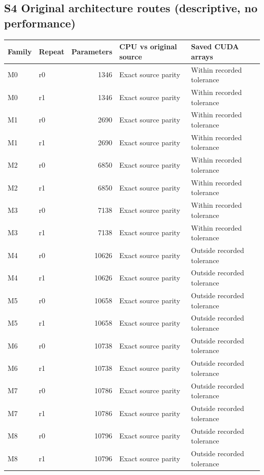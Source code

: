 \documentclass[9pt,a4paper]{extarticle}
\begin{document}
\subsection*{S4 Original architecture routes (descriptive, no performance)}\small
\begin{longtable}{llrll}
\toprule
Family & Repeat & Parameters & CPU vs original source & Saved CUDA arrays \\
\midrule
\endhead
M0 & r0 & 1346 & Exact source parity & Within recorded tolerance \\
M0 & r1 & 1346 & Exact source parity & Within recorded tolerance \\
M1 & r0 & 2690 & Exact source parity & Within recorded tolerance \\
M1 & r1 & 2690 & Exact source parity & Within recorded tolerance \\
M2 & r0 & 6850 & Exact source parity & Within recorded tolerance \\
M2 & r1 & 6850 & Exact source parity & Within recorded tolerance \\
M3 & r0 & 7138 & Exact source parity & Within recorded tolerance \\
M3 & r1 & 7138 & Exact source parity & Within recorded tolerance \\
M4 & r0 & 10626 & Exact source parity & Outside recorded tolerance \\
M4 & r1 & 10626 & Exact source parity & Outside recorded tolerance \\
M5 & r0 & 10658 & Exact source parity & Outside recorded tolerance \\
M5 & r1 & 10658 & Exact source parity & Outside recorded tolerance \\
M6 & r0 & 10738 & Exact source parity & Outside recorded tolerance \\
M6 & r1 & 10738 & Exact source parity & Outside recorded tolerance \\
M7 & r0 & 10786 & Exact source parity & Outside recorded tolerance \\
M7 & r1 & 10786 & Exact source parity & Outside recorded tolerance \\
M8 & r0 & 10796 & Exact source parity & Outside recorded tolerance \\
M8 & r1 & 10796 & Exact source parity & Outside recorded tolerance \\
\bottomrule
\end{longtable}
\end{document}
